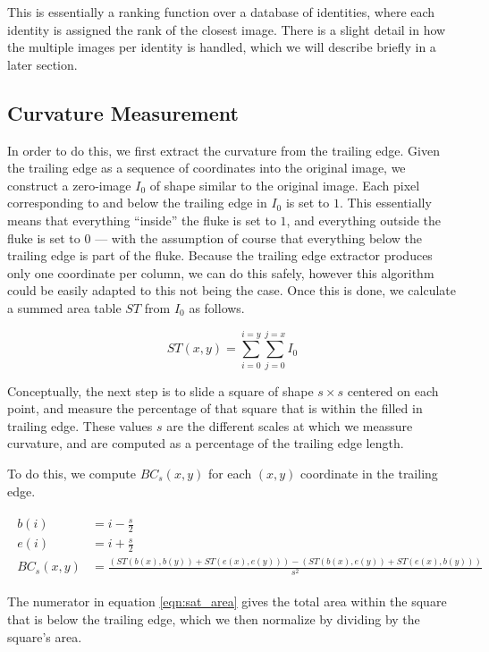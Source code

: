 This is essentially a ranking function over a database of identities, where each identity is assigned the rank of the closest image.
There is a slight detail in how the multiple images per identity is handled, which we will describe briefly in a later section.

\subsection{Curvature Measurement}

In order to do this, we first extract the curvature from the trailing edge.
Given the trailing edge as a sequence of coordinates into the original image, we construct a zero-image $I_0$ of shape similar to the original image.
Each pixel corresponding to and below the trailing edge in $I_0$ is set to $1$.
This essentially means that everything ``inside'' the fluke is set to $1$, and everything outside the fluke is set to $0$ --- with the assumption of course that everything below the trailing edge is part of the fluke.
Because the trailing edge extractor produces only one coordinate per column, we can do this safely, however this algorithm could be easily adapted to this not being the case.
Once this is done, we calculate a summed area table \cite{crow1984summed} $ST$ from $I_0$ as follows.

\begin{equation} \label{eqn:sat}
ST(x,y) = \sum_{i=0}^{i=y}\sum_{j=0}^{j=x} I_0 
\end{equation}

Conceptually, the next step is to slide a square of shape $s \times s$ centered on each point, and measure the percentage of that square that is within the filled in trailing edge.
These values $s$ are the different scales at which we meassure curvature, and are computed as a percentage of the trailing edge length.

To do this, we compute $BC_s(x, y)$ for each $(x, y)$ coordinate in the trailing edge.

\begin{align} \label{eqn:sat_area}
\begin{split}
b(i) &= i - \frac{s}{2}\\
e(i) &= i + \frac{s}{2}\\
BC_s(x,y) &= \frac{(ST(b(x), b(y)) + ST(e(x), e(y))) - (ST(b(x), e(y)) + ST(e(x), b(y)))}{s^2}
\end{split}
\end{align}

The numerator in equation \eqref{eqn:sat_area} gives the total area within the square that is below the trailing edge, which we then normalize by dividing by the square's area.

